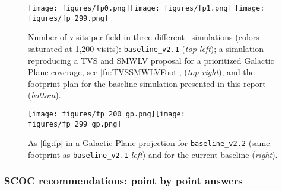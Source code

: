 \begin{figure}
    \centering
    \texttt{[image: figures/fp0.png]}\texttt{[image: figures/fp1.png]}
    \texttt{[image: figures/fp\_299.png]}
    \caption{Number of visits per field in three different \opsim\ simulations (colors saturated at 1,200 visits):  \texttt{baseline\_v2.1} (\emph{top left}); a simulation reproducing a TVS and SMWLV proposal for a prioritized Galactic Plane coverage, see \autoref{fn:TVSSMWLVFoot},
    (\emph{top right}), and the footprint plan for the baseline simulation presented in this report (\emph{bottom}).}
    \label{fig:fp}
\end{figure}

\begin{figure}
    \centering
    \texttt{[image: figures/fp\_200\_gp.png]}\texttt{[image: figures/fp\_299\_gp.png]}
    \caption{As \autoref{fig:fp} in a Galactic Plane projection for \texttt{baseline\_v2.2} (same footprint as \texttt{baseline\_v2.1}  \emph{left}) and for the current baseline (\emph{right}).}
    \label{fig:fp2}
\end{figure}

\subsubsection{SCOC recommendations: point by point answers}\label{rec:footprint}


